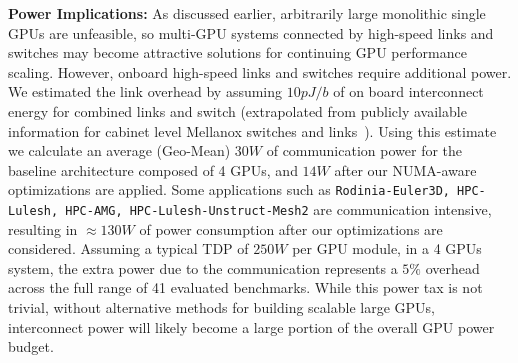 \textbf{Power Implications:} As discussed earlier, arbitrarily large monolithic 
single GPUs are unfeasible, so multi-GPU systems connected by 
high-speed links and switches may become attractive solutions for continuing 
GPU performance scaling. However, onboard high-speed links and switches 
require additional power. We estimated the link overhead by assuming $10 pJ/b$ of 
on board interconnect energy for combined links and switch (extrapolated from 
publicly available information for cabinet level Mellanox switches and 
links~\cite{mlswitch,mlnic}). Using this estimate we calculate an average 
(Geo-Mean) $30 W$ of communication power for the baseline 
architecture composed of 4 GPUs, and $14 W$ after 
our NUMA-aware optimizations are applied. Some applications such as 
\texttt{Rodinia-Euler3D, HPC-Lulesh, HPC-AMG, HPC-Lulesh-Unstruct-Mesh2} are 
communication intensive, resulting in $\approx 130 W$ of power consumption after our 
optimizations are considered. Assuming a typical TDP of $250 W$ per GPU module, 
in a 4 GPUs system, the extra power due to the communication represents a $5\%$ 
overhead across the full range of 41 evaluated benchmarks.  While this power
tax is not trivial, without alternative methods for building scalable large
GPUs, interconnect power will likely become a large portion of the overall
GPU power budget.
